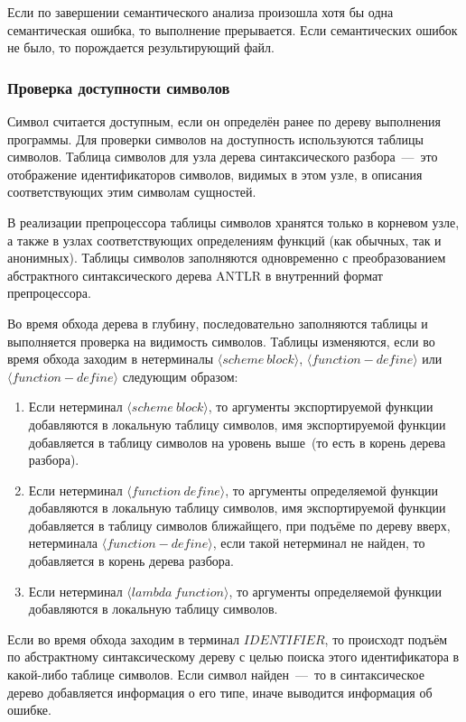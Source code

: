 \documentclass[12pt,a4paper,oneside]{extarticle}
\begin{document}
            Если по завершении семантического анализа произошла хотя бы одна семантическая ошибка, то выполнение прерывается. Если семантических ошибок не было, то порождается результирующий файл.

        \subsubsection{Проверка доступности символов}
            Символ считается доступным, если он определён ранее по дереву выполнения программы.
            Для проверки символов на доступность используются таблицы символов.
            Таблица символов для узла дерева синтаксического разбора~---~это отображение идентификаторов символов, видимых в этом узле, в описания соответствующих этим символам сущностей.

            В реализации препроцессора таблицы символов хранятся только в корневом узле, а также в узлах соответствующих определениям функций (как обычных, так и анонимных). Таблицы символов заполняются одновременно с преобразованием абстрактного синтаксического дерева ANTLR в внутренний формат препроцессора. 

            Во время обхода дерева в глубину, последовательно заполняются таблицы и выполняется проверка на видимость символов. Таблицы изменяются, если во время обхода заходим в нетерминалы $\langle scheme~block \rangle$, $\langle function-define \rangle$ или $\langle function-define \rangle$ следующим образом:
            \begin{enumerate}
                \item Если нетерминал $\langle scheme~block \rangle$, то аргументы экспортируемой функции добавляются в локальную таблицу символов, имя экспортируемой функции добавляется в таблицу символов на уровень выше~(то есть в корень дерева разбора).
                \item Если нетерминал $\langle function~define \rangle$, то аргументы определяемой функции добавляются в локальную таблицу символов, имя экспортируемой функции добавляется в таблицу символов ближайщего, при подъёме по дереву вверх, нетерминала $\langle function-define \rangle$, если такой нетерминал не найден, то добавляется в корень дерева разбора.
                \item Если нетерминал $\langle lambda~function \rangle$, то аргументы определяемой функции добавляются в локальную таблицу символов.
            \end{enumerate}

            Если во время обхода заходим в терминал $IDENTIFIER$, то происходт подъём по абстрактному синтаксическому дереву с целью поиска этого идентификатора в какой-либо таблице символов. Если символ найден~---~то в синтаксическое дерево добавляется информация о его типе, иначе выводится информация об ошибке.
\end{document}
